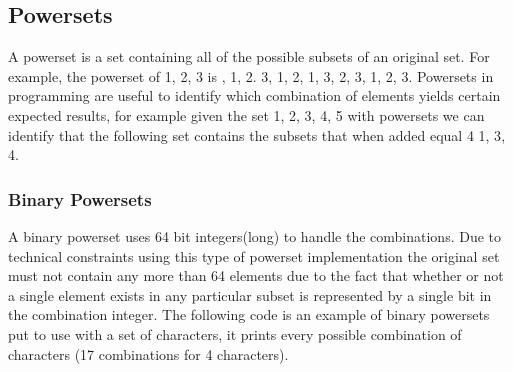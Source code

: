 \documentclass[letterpaper]{article}
\begin{document}
		\subsection{Powersets}
			A powerset is a set containing all of the possible subsets of an original set. For example, the powerset of {1, 2, 3} is {{}, {1}, {2}. {3}, {1, 2}, {1, 3}, {2, 3}, {1, 2, 3}}. Powersets in programming are useful to identify which combination of elements yields certain expected results, for example given the set {1, 2, 3, 4, 5} with powersets we can identify that the following set contains the subsets that when added equal 4 {{1, 3}, {4}}.

			\subsubsection{Binary Powersets}
			A binary powerset uses 64 bit integers(long) to handle the combinations. Due to technical constraints using this type of powerset implementation the original set must not contain any more than 64 elements due to the fact that whether or not a single element exists in any particular subset is represented by a single bit in the combination integer. The following code is an example of binary powersets put to use with a set of characters, it prints every possible combination of characters (17 combinations for 4 characters).
			
\end{document}
